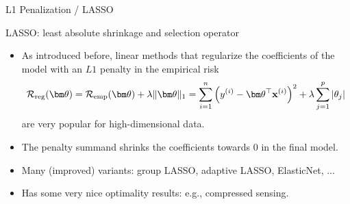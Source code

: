 \begin{vbframe}{L1 Penalization / LASSO}

LASSO: least absolute shrinkage and selection operator
\begin{itemize}
  \item As introduced before, linear methods that regularize the coefficients of the model with an $L1$ penalty in the empirical risk
  $$ \riskrt = \risket + \lambda \|\thetab\|_1 = \sumin \left(\yi - \thetab^\top \xi \right)^2 +\lambda \sum_{j=1}^p |\theta_j| $$
  are very popular for high-dimensional data.
  \item The penalty summand shrinks the coefficients towards 0 in the final model.
  \item Many (improved) variants: group LASSO, adaptive LASSO, ElasticNet, ...
  \item Has some very nice optimality results: e.g., compressed sensing.
\end{itemize}
\end{vbframe}


\endlecture


